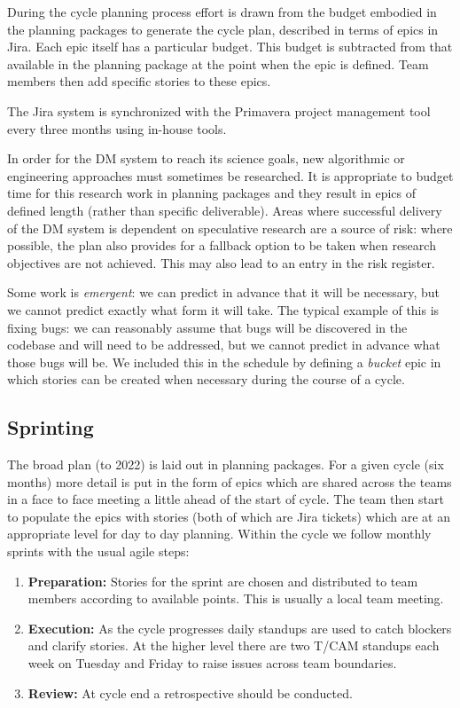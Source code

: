 During the cycle planning process  effort is drawn from the budget embodied in the planning packages to generate the cycle plan, described in terms of epics in Jira.
Each epic itself has a particular budget.
This budget is subtracted from that available in the planning package at the point when the epic is defined.
Team members then add specific stories to these epics.

The Jira system is synchronized with the Primavera project management tool every three months using in-house tools.

In order for the DM system to reach its science goals, new algorithmic or engineering approaches must sometimes be researched.
It is appropriate to budget time for this research work in planning packages and they result in epics of defined length (rather than specific  deliverable).
Areas where successful delivery of the DM system is dependent on speculative research are a source of risk: where possible, the plan  also provides for a fallback option to be taken when research objectives are not achieved.
This may also lead to an entry in the risk register.


Some work is \emph{emergent}: we can predict in advance that it will be necessary, but we cannot
predict exactly what form it will take. The typical example of this is fixing bugs: we can reasonably
assume that bugs will be discovered in the codebase and will need to be addressed,
but we cannot predict in advance what those bugs will be.
We included this in the schedule by defining a \emph{bucket} epic in which stories can be created
when necessary during the course of a cycle.

\subsection{Sprinting} \label{sec:spront} \label{sec:jira_ticket}
The broad plan (to 2022) is laid out in planning packages.
For a  given  cycle (six months)   more detail is put in the form of epics which  are shared across the teams in a face to face meeting a little ahead of the start of cycle.  The team then start to populate the epics with stories (both of which are Jira tickets)  which are at an appropriate level for day to day planning.
Within the cycle we follow monthly sprints with the usual agile steps:
\begin{enumerate}
\item \textbf{Preparation:} Stories for the sprint are chosen and distributed to team members according to available points. This is usually a local team meeting.
\item \textbf{Execution:} As the cycle progresses daily standups are used to catch blockers and clarify stories. At the higher level there are two T/CAM standups each week on Tuesday and Friday to raise issues across team boundaries.
\item \textbf{Review:} At cycle end a retrospective should be conducted.
\end{enumerate}

